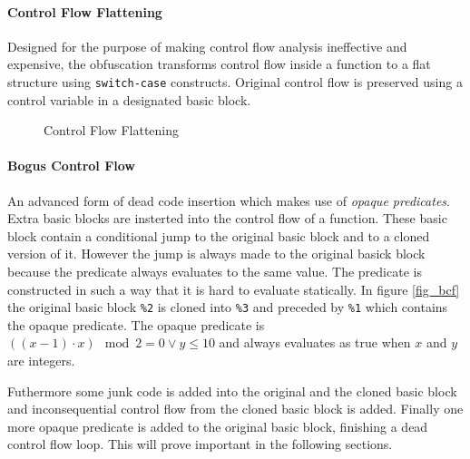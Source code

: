 \paragraph{Control Flow Flattening} Designed for the purpose of making control flow analysis ineffective and expensive, the obfuscation transforms control flow inside a function to a flat structure using \texttt{switch-case} constructs. Original control flow is preserved using a control variable in a designated basic block.

\begin{figure}[H]
    \centering
    \caption{Control Flow Flattening}
    \label{fig_flattening}
\end{figure}

\paragraph{Bogus Control Flow} An advanced form of dead code insertion which makes use of \emph{opaque predicates}. Extra basic blocks are insterted into the control flow of a function. These basic block contain a conditional jump to the original basic block and to a cloned version of it. However the jump is always made to the original basick block because the predicate always evaluates to the same value. The predicate is constructed in such a way that it is hard to evaluate statically. In figure \ref{fig_bcf} the original basic block \texttt{\%2} is cloned into \texttt{\%3} and preceded by \texttt{\%1} which contains the opaque predicate. The opaque predicate is $((x-1) \cdot x) \mod 2 = 0 \vee y \leq 10$ and always evaluates as true when $x$ and $y$ are integers. 

Futhermore some junk code is added into the original and the cloned basic block and inconsequential control flow from the cloned basic block is added. Finally one more opaque predicate is added to the original basic block, finishing a dead control flow loop. This will prove important in the following sections.

